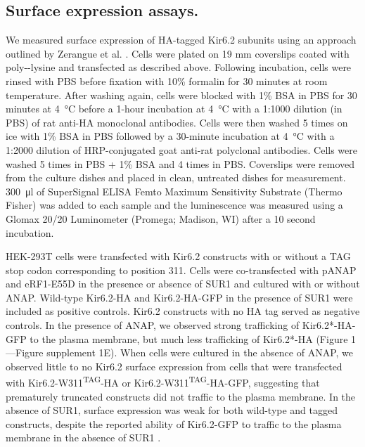 \documentclass[10pt,lineno, doublespacing]{elife_modified}
\begin{document}
\subsection{Surface expression assays.}
We measured surface expression of HA-tagged Kir6.2 subunits using an approach outlined by Zerangue et al. \citep{RN38, RN80}.
Cells were plated on 19 mm coverslips coated with poly--lysine and transfected as described above.
Following incubation, cells were rinsed with PBS before fixation with 10\% formalin for 30 minutes at room temperature.
After washing again, cells were blocked with 1\% BSA in PBS for 30 minutes at \SI{4}{\degreeCelsius} before a 1-hour incubation at \SI{4}{\degreeCelsius} with a 1:1000 dilution (in PBS) of rat anti-HA monoclonal antibodies.
Cells were then washed 5 times on ice with 1\% BSA in PBS followed by a 30-minute incubation at \SI{4}{\degreeCelsius} with a 1:2000 dilution of HRP-conjugated goat anti-rat polyclonal antibodies.
Cells were washed 5 times in PBS + 1\% BSA and 4 times in PBS.
Coverslips were removed from the culture dishes and placed in clean, untreated dishes for measurement.
\SI{300}{\micro\litre} of SuperSignal ELISA Femto Maximum Sensitivity Substrate (Thermo Fisher) was added to each sample and the luminescence was measured using a Glomax 20/20 Luminometer (Promega; Madison, WI) after a 10 second incubation.

HEK-293T cells were transfected with Kir6.2 constructs with or without a TAG stop codon corresponding to position 311.
Cells were co-transfected with pANAP and eRF1-E55D in the presence or absence of SUR1 and cultured with or without ANAP.
Wild-type Kir6.2-HA and Kir6.2-HA-GFP in the presence of SUR1 were included as positive controls.
Kir6.2 constructs with no HA tag served as negative controls.
In the presence of ANAP, we observed strong trafficking of Kir6.2*-HA-GFP to the plasma membrane, but much less trafficking of Kir6.2*-HA (Figure 1—Figure supplement 1E).
When cells were cultured in the absence of ANAP, we observed little to no Kir6.2 surface expression from cells that were transfected with Kir6.2-W311\textsuperscript{TAG}-HA or Kir6.2-W311\textsuperscript{TAG}-HA-GFP, suggesting that prematurely truncated constructs did not traffic to the plasma membrane.
In the absence of SUR1, surface expression was weak for both wild-type and tagged constructs, despite the reported ability of Kir6.2-GFP to traffic to the plasma membrane in the absence of SUR1 \citep{RN86, RN48}.
\end{document}
